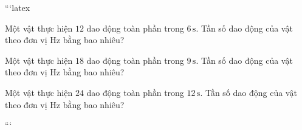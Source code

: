 ```latex

\begin{ex}
Một vật thực hiện $12$ dao động toàn phần trong $6\,\mathrm{s}$. Tần số dao động của vật theo đơn vị Hz bằng bao nhiêu?


\end{ex}


\begin{ex}
Một vật thực hiện $18$ dao động toàn phần trong $9\,\mathrm{s}$. Tần số dao động của vật theo đơn vị Hz bằng bao nhiêu?


\end{ex}


\begin{ex}
Một vật thực hiện $24$ dao động toàn phần trong $12\,\mathrm{s}$. Tần số dao động của vật theo đơn vị Hz bằng bao nhiêu?


\end{ex}
```


